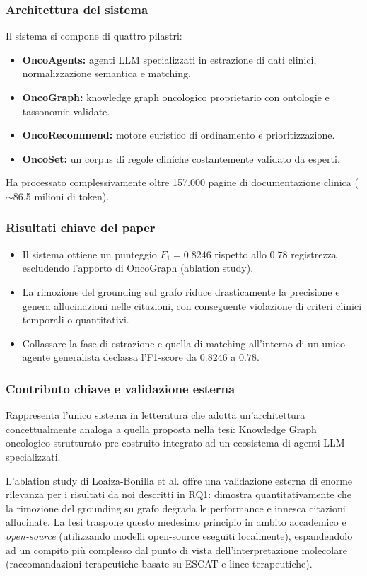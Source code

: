 \documentclass[11pt,a4paper]{article}
\begin{document}
\subsubsection*{Architettura del sistema}
Il sistema si compone di quattro pilastri:
\begin{itemize}
  \item \textbf{OncoAgents:} agenti LLM specializzati in estrazione di dati clinici, normalizzazione semantica e matching.
  \item \textbf{OncoGraph:} knowledge graph oncologico proprietario con ontologie e tassonomie validate.
  \item \textbf{OncoRecommend:} motore euristico di ordinamento e prioritizzazione.
  \item \textbf{OncoSet:} un corpus di regole cliniche costantemente validato da esperti.
\end{itemize}
Ha processato complessivamente oltre 157.000 pagine di documentazione clinica ($\sim$86.5 milioni di token).

\subsubsection*{Risultati chiave del paper}
\begin{itemize}
  \item Il sistema ottiene un punteggio $F_1 = 0.8246$ rispetto allo $0.78$ registrezza escludendo l'apporto di OncoGraph (ablation study).
  \item La rimozione del grounding sul grafo riduce drasticamente la precisione e genera allucinazioni nelle citazioni, con conseguente violazione di criteri clinici temporali o quantitativi.
  \item Collassare la fase di estrazione e quella di matching all'interno di un unico agente generalista declassa l'F1-score da $0.8246$ a $0.78$.
\end{itemize}

\subsubsection*{Contributo chiave e validazione esterna}
Rappresenta l'unico sistema in letteratura che adotta un'architettura concettualmente analoga a quella proposta nella tesi: Knowledge Graph oncologico strutturato pre-costruito integrato ad un ecosistema di agenti LLM specializzati.

L'ablation study di Loaiza-Bonilla et al. offre una validazione esterna di enorme rilevanza per i risultati da noi descritti in RQ1: dimostra quantitativamente che la rimozione del grounding su grafo degrada le performance e innesca citazioni allucinate. La tesi traspone questo medesimo principio in ambito accademico e \emph{open-source} (utilizzando modelli open-source eseguiti localmente), espandendolo ad un compito più complesso dal punto di vista dell'interpretazione molecolare (raccomandazioni terapeutiche basate su ESCAT e linee terapeutiche).
\end{document}

